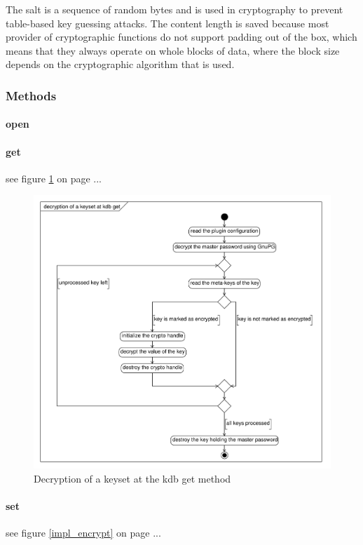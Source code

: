 The salt is a sequence of random bytes and is used in cryptography to prevent table-based key guessing attacks.
The content length is saved because most provider of cryptographic functions do not support padding out of the box, which means that they always operate on whole blocks of data, where the block size depends on the cryptographic algorithm that is used.

\subsubsection{Methods}

\paragraph*{open}

\paragraph*{get}
see figure \ref{impl_decrypt} on page \pageref{impl_decrypt}...

\begin{figure}[h]
\center
\caption{Decryption of a keyset at the kdb get method}
\label{impl_decrypt}
\includegraphics[width=15.0cm]{umlet-figures/impl_decrypt.pdf}
\end{figure}


\paragraph*{set}
see figure \ref{impl_encrypt} on page \pageref{impl_encrypt}...


